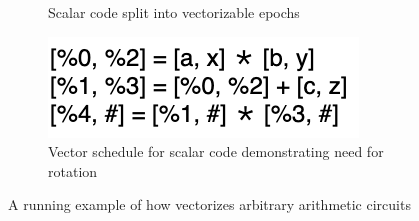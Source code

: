 \begin{figure}
\begin{subfigure}{0.3\columnwidth}
        \caption{Scalar code split into vectorizable epochs}
        \label{fig:code-split-epochs}
    \end{subfigure}
    \begin{subfigure}{0.6\columnwidth}
        \includegraphics[scale=0.3]{figures/compilation_overview/vector_schedule_needing_rotates.drawio.png}
        \caption{Vector schedule for scalar code demonstrating need for rotation}
        \label{fig:vector-sched-needing-rotates}
    \end{subfigure}
    \caption{A running example of how \system vectorizes arbitrary arithmetic circuits}
    \label{fig:toy-running-example}
\end{figure}

